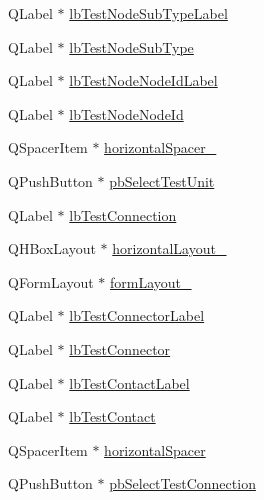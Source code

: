 \begin{DoxyCompactItemize}
\item 
Q\-Label $\ast$ \hyperlink{class_ui__mdt_tt_test_link_dialog_a4b44adc6d9fce271a5df112362050661}{lb\-Test\-Node\-Sub\-Type\-Label}
\item 
Q\-Label $\ast$ \hyperlink{class_ui__mdt_tt_test_link_dialog_aa14fdcee18956d9e61c83eb1b3313ad8}{lb\-Test\-Node\-Sub\-Type}
\item 
Q\-Label $\ast$ \hyperlink{class_ui__mdt_tt_test_link_dialog_a214b09787cff9230414eebf4eebe7fdc}{lb\-Test\-Node\-Node\-Id\-Label}
\item 
Q\-Label $\ast$ \hyperlink{class_ui__mdt_tt_test_link_dialog_ad647c1e4793f1e4a324cbdb026dcd605}{lb\-Test\-Node\-Node\-Id}
\item 
Q\-Spacer\-Item $\ast$ \hyperlink{class_ui__mdt_tt_test_link_dialog_a84e2e5456dd04a4fc94d1bc294ecee0d}{horizontal\-Spacer\-\_}
\item 
Q\-Push\-Button $\ast$ \hyperlink{class_ui__mdt_tt_test_link_dialog_a13fde7ce3d35533de08fb470043fdd55}{pb\-Select\-Test\-Unit}
\item 
Q\-Label $\ast$ \hyperlink{class_ui__mdt_tt_test_link_dialog_a140948071c242ac25391269da9553a27}{lb\-Test\-Connection}
\item 
Q\-H\-Box\-Layout $\ast$ \hyperlink{class_ui__mdt_tt_test_link_dialog_aab35977239cf35d2091d160eded59834}{horizontal\-Layout\-\_}
\item 
Q\-Form\-Layout $\ast$ \hyperlink{class_ui__mdt_tt_test_link_dialog_a2f3cdfba62a998b04743cdc1b9a7fa15}{form\-Layout\-\_}
\item 
Q\-Label $\ast$ \hyperlink{class_ui__mdt_tt_test_link_dialog_a41e738b11e495b39941f0d7e44b0d8c5}{lb\-Test\-Connector\-Label}
\item 
Q\-Label $\ast$ \hyperlink{class_ui__mdt_tt_test_link_dialog_a425d54d98c98099b3977d845051b2245}{lb\-Test\-Connector}
\item 
Q\-Label $\ast$ \hyperlink{class_ui__mdt_tt_test_link_dialog_aa0529fd27d9ca0fc952ea38ad7d71df9}{lb\-Test\-Contact\-Label}
\item 
Q\-Label $\ast$ \hyperlink{class_ui__mdt_tt_test_link_dialog_ab505ede9ab53e3850cab1641a20b3c1c}{lb\-Test\-Contact}
\item 
Q\-Spacer\-Item $\ast$ \hyperlink{class_ui__mdt_tt_test_link_dialog_a28aca1bd98f1aedec9297a7663bb3b92}{horizontal\-Spacer}
\item 
Q\-Push\-Button $\ast$ \hyperlink{class_ui__mdt_tt_test_link_dialog_ac68599c57b51935e469cb0b1f8e16146}{pb\-Select\-Test\-Connection}
\item 

\end{DoxyCompactItemize}
